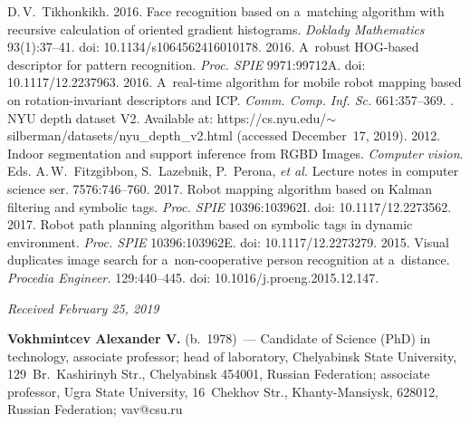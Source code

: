 \begin{multicols}{2}
{{\begin{thebibliography}{99}
{D.\,V.~Tikhonkikh.} 2016. Face recognition based on a~matching algorithm with 
recursive calculation of oriented gradient histograms. \textit{Doklady 
Mathematics}  
93(1):37--41. doi: 10.1134/s1064562416010178.
 2016. A~robust HOG-based descriptor 
for pattern recognition. \textit{Proc. SPIE} 9971:99712A. doi: 10.1117/12.2237963.
 2016. A~real-time algorithm for 
mobile robot mapping based on rotation-invariant descriptors and ICP. 
\textit{Comm. Comp. Inf. Sc.} 661:357--369. 
. NYU depth dataset 
V2. Available at: {\sf 
https://cs.nyu.edu/\linebreak $\sim$silberman/datasets/nyu\_depth\_v2.html} (accessed 
December~17, 2019).
 2012. Indoor 
segmentation and support inference from RGBD Images. \textit{Computer vision}. 
Eds. A.\,W.~Fitzgibbon, S.~Lazebnik, P.~Perona,
\textit{et al.}
Lecture notes in computer science ser.  
7576:746--760. 
 2017. Robot mapping algorithm based on Kalman filtering and 
symbolic tags. \textit{Proc. SPIE} 10396:103962I. doi: 10.1117/12.2273562.
 2017. Robot path planning algorithm based on symbolic tags in 
dynamic environment. \textit{Proc. SPIE} 10396:103962E. doi: 10.1117/12.2273279.
 2015. Visual duplicates image search 
for a~non-cooperative person recognition at a~distance. \textit{Procedia 
Engineer.} 129:440--445. doi: 10.1016/j.proeng.2015.12.147.
\end{thebibliography}

 }
 }

\end{multicols}


\hfill{\small\textit{Received February 25, 2019}}



\Contr

\noindent
\textbf{Vokhmintcev Alexander V.} (b.\ 1978)~--- 
Candidate of Science (PhD) in technology, associate professor; 
head of laboratory, Chelyabinsk State University, 
129~Br.~Kashirinyh Str., Chelyabinsk 454001, Russian Federation; 
associate professor, Ugra State University, 16~Chekhov Str.,
 Khanty-Mansiysk, 628012, Russian Federation; 
\mbox{vav@csu.ru}

